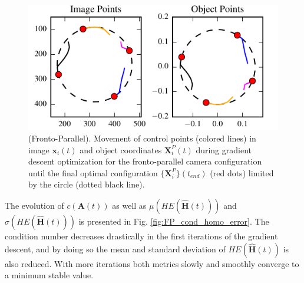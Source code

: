 \documentclass[letterpaper, 10 pt, conference]{ieeeconf}  %
\begin{document}
	\begin{figure}[t]
		\begin{center}
			\includegraphics[width=\columnwidth]{img/image_control_points.pdf}
			\caption{\label{fig:FP_points}\small (Fronto-Parallel). Movement of control points (colored lines) in image $\mathbf{x}_i(t)$ and object coordinates $\mathbf{X}^P_i(t)$ during gradient descent optimization for the fronto-parallel camera configuration until the final optimal configuration $\{\mathbf{X}^P_{i}\}(t_{end})$ (red dots) limited by the circle (dotted black line). }
		\end{center}
		\vspace{-0.5cm}
	\end{figure}
	
	
	The evolution of $c(\mathbf{A}(t))$ as well as $\mu\left(HE\left(\hat{\mathbf{H}}(t)\right)\right)$ and $\sigma\left(HE\left(\hat{\mathbf{H}}(t)\right)\right)$
	is presented in Fig. \ref{fig:FP_cond_homo_error}. The condition number decreases drastically in the first iterations of the gradient descent,  and by doing so the mean and standard deviation of $HE\left(\hat{\mathbf{H}}(t)\right)$ is also reduced. With more iterations both metrics slowly and smoothly converge to a minimum stable value. 
	
\end{document}
